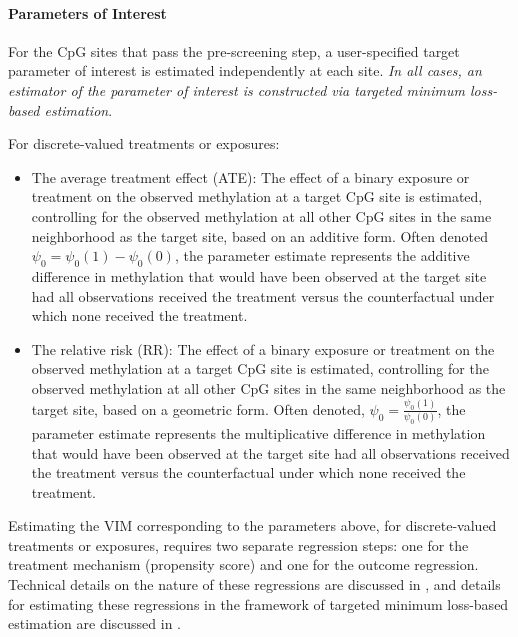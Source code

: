 \documentclass[9pt,a4paper,]{extarticle}
\theoremstyle{definition}
\theoremstyle{definition}
\theoremstyle{definition}
\theoremstyle{remark}
\begin{document}
\hypertarget{parameters-of-interest}{%
\paragraph{Parameters of Interest}\label{parameters-of-interest}}

For the CpG sites that pass the pre-screening step, a user-specified target
parameter of interest is estimated independently at each site. \emph{In all cases,
an estimator of the parameter of interest is constructed via targeted minimum
loss-based estimation}.

For discrete-valued treatments or exposures:

\begin{itemize}
\item
  The average treatment effect (ATE): The effect of a binary exposure or
  treatment on the observed methylation at a target CpG site is estimated,
  controlling for the observed methylation at all other CpG sites in the same
  neighborhood as the target site, based on an additive form. Often denoted
  \(\psi_0 = \psi_0(1) - \psi_0(0)\), the parameter estimate represents the
  additive difference in methylation that would have been observed at the
  target site had all observations received the treatment versus the
  counterfactual under which none received the treatment.
\item
  The relative risk (RR): The effect of a binary exposure or treatment on the
  observed methylation at a target CpG site is estimated, controlling for the
  observed methylation at all other CpG sites in the same neighborhood as the
  target site, based on a geometric form. Often denoted,
  \(\psi_0 = \frac{\psi_0(1)}{\psi_0(0)}\), the parameter estimate represents the
  multiplicative difference in methylation that would have
  been observed at the target site had all observations received the treatment
  versus the counterfactual under which none received the treatment.
\end{itemize}

Estimating the VIM corresponding to the parameters above, for discrete-valued
treatments or exposures, requires two separate regression steps: one for the
treatment mechanism (propensity score) and one for the outcome regression.
Technical details on the nature of these regressions are discussed in
\citet{hernan2018causal}, and details for estimating these regressions in the
framework of targeted minimum loss-based estimation are discussed in
\citet{vdl2011targeted}.
\end{document}
